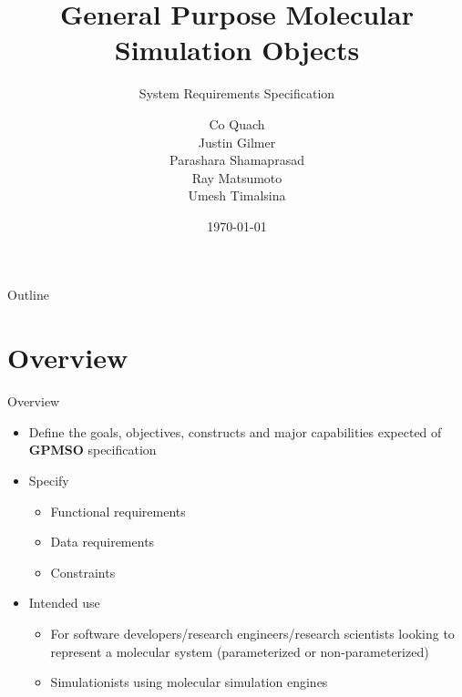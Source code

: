 \documentclass[xcolor=table]{beamer}
\title[GPSMO]{General Purpose Molecular Simulation Objects}
\subtitle[]{System Requirements Specification}
\author[Quach et. al.]{Co Quach \\ Justin Gilmer \\  Parashara Shamaprasad \\ Ray Matsumoto \\ Umesh Timalsina}
\institute[MoSDeF]{MoSDeF}
\date{\today}
\begin{document}
\begin{frame}
  \titlepage
\end{frame}

\begin{frame}{Outline}
  \tableofcontents
\end{frame}

\section{Overview}
\begin{frame}{Overview}
\begin{itemize}
\item Define the goals, objectives, constructs and major capabilities expected of \textbf{GPMSO} specification

\item Specify
    \begin{itemize}
        \item Functional requirements
        \item Data requirements
        \item Constraints
    \end{itemize}
\item Intended use
    \begin{itemize}
        \item For software developers/research engineers/research scientists looking to represent a molecular system (parameterized or non-parameterized)
        \item Simulationists using molecular simulation engines
    \end{itemize}

\end{itemize}
\end{frame}
\end{document}
